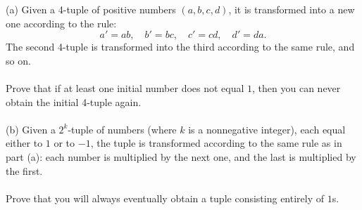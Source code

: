 \begin{problem}
    (a) Given a 4-tuple of positive numbers \( \left(a,b,c,d\right) \), it is transformed into a new one according to the rule:
    \[
        a' = ab, \quad b' = bc, \quad c' = cd, \quad d' = da.
    \]
    The second 4-tuple is transformed into the third according to the same rule, and so on.
    \\\\
    Prove that if at least one initial number does not equal \( 1 \), then you can never obtain the initial 4-tuple again.
    \\\\
    (b) Given a \( 2^k \)-tuple of numbers (where \( k \) is a nonnegative integer), each equal either to \( 1 \) or to \( -1 \), the tuple is transformed according to the same rule as in part (a): each number is multiplied by the next one, and the last is multiplied by the first.
    \\\\
    Prove that you will always eventually obtain a tuple consisting entirely of \( 1 \)s.
\end{problem}
